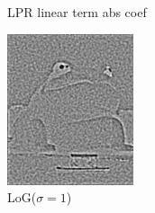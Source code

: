 \documentclass{article}
\begin{document}
\begin{figure}[htb]
\begin{subfigure}[b]{0.24\linewidth}
    \caption{LPR linear term abs coef}
  \end{subfigure}
  \begin{subfigure}[b]{0.24\linewidth}
    \includegraphics[width=\linewidth]{images/edge_3.png}
    \caption{LoG($\sigma=1$)}
  \end{subfigure}
  \begin{subfigure}[b]{0.24\linewidth}

\end{subfigure}
\end{figure}
\end{document}
